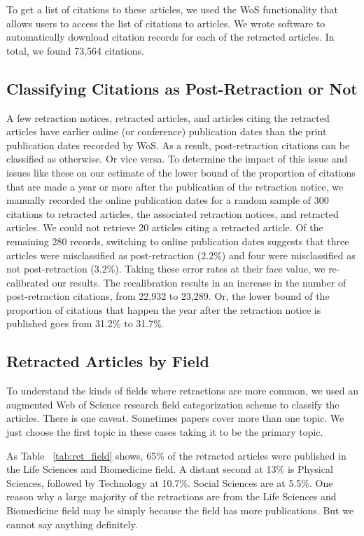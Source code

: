 \documentclass[12pt]{article}
\begin{document}
To get a list of citations to these articles, we used the WoS functionality that allows users to access the list of citations to articles. We wrote software to automatically download citation records for each of the retracted articles. In total, we found 73,564 citations.

\subsection{Classifying Citations as Post-Retraction or Not}
A few retraction notices, retracted articles, and articles citing the retracted articles have earlier online (or conference) publication dates than the print publication dates recorded by WoS. As a result, post-retraction citations can be classified as otherwise. Or vice versa. To determine the impact of this issue and issues like these on our estimate of the lower bound of the proportion of citations that are made a year or more after the publication of the retraction notice, we manually recorded the online publication dates for a random sample of 300 citations to retracted articles, the associated retraction notices, and retracted articles. We could not retrieve 20 articles citing a retracted article.  Of the remaining 280 records, switching to online publication dates suggests that three articles were misclassified as post-retraction (2.2\%) and four were misclassified as not post-retraction (3.2\%). Taking these error rates at their face value, we re-calibrated our results. The recalibration results in an increase in the number of post-retraction citations, from 22,932 to 23,289. Or, the lower bound of the proportion of citations that happen the year after the retraction notice is published goes from 31.2\% to 31.7\%.

\subsection{Retracted Articles by Field}
\label{ret_art_by_field}
To understand the kinds of fields where retractions are more common, we used an augmented Web of Science research field categorization scheme to classify the articles. There is one caveat. Sometimes papers cover more than one topic. We just choose the first topic in these cases taking it to be the primary topic. 

As Table ~\ref{tab:ret_field} shows, 65\% of the retracted articles were published in the Life Sciences and Biomedicine field.  A distant second at 13\% is Physical Sciences, followed by Technology at 10.7\%. Social Sciences are at 5.5\%.  One reason why a large majority of the retractions are from the  Life Sciences and Biomedicine field may be simply because the field has more publications. But we cannot say anything definitely.
\end{document}
